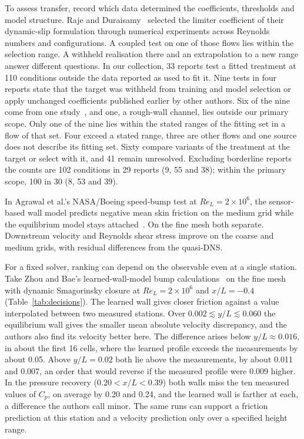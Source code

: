 \documentclass[pdflatex,sn-nature,iicol]{sn-jnl}
\begin{document}
To assess transfer, record which data determined the coefficients, thresholds and model structure. Raje and Duraisamy~\cite{Raje2025} selected the limiter coefficient of their dynamic-slip formulation through numerical experiments across Reynolds numbers and configurations. A coupled test on one of those flows lies within the selection range. A withheld realisation there and an extrapolation to a new range answer different questions. In our collection, 33 reports test a fitted treatment at 110 conditions outside the data reported as used to fit it. Nine tests in four reports state that the target was withheld from training and model selection or apply unchanged coefficients published earlier by other authors. Six of the nine come from one study~\cite{LozanoDuranBae2023}, and one, a rough-wall channel, lies outside our primary scope. Only one of the nine lies within the stated ranges of the fitting set in a flow of that set. Four exceed a stated range, three are other flows and one source does not describe its fitting set. Sixty compare variants of the treatment at the target or select with it, and 41 remain unresolved. Excluding borderline reports the counts are 102 conditions in 29 reports (9, 55 and 38); within the primary scope, 100 in 30 (8, 53 and 39).

In Agrawal et al.'s NASA/Boeing speed-bump test at $Re_L=2\times10^6$, the sensor-based wall model predicts negative mean skin friction on the medium grid while the equilibrium model stays attached~\cite{Agrawal2024}. On the fine mesh both separate. Downstream velocity and Reynolds shear stress improve on the coarse and medium grids, with residual differences from the quasi-DNS.

\noindent For a fixed solver, ranking can depend on the observable even at a single station. Take Zhou and Bae's learned-wall-model bump calculations~\cite{DiZhou2024} on the fine mesh with dynamic Smagorinsky closure at $Re_L=2\times10^6$ and $x/L=-0.4$ (Table~\ref{tab:decisions}). The learned wall gives closer friction against a value interpolated between two measured stations. Over $0.002\lesssim y/L\lesssim0.060$ the equilibrium wall gives the smaller mean absolute velocity discrepancy, and the authors also find its velocity better here. The difference arises below $y/L\approx0.016$, in about the first 16 cells, where the learned profile exceeds the measurements by about 0.05. Above $y/L=0.02$ both lie above the measurements, by about 0.011 and 0.007, an order that would reverse if the measured profile were 0.009 higher. In the pressure recovery ($0.20<x/L<0.39$) both walls miss the ten measured values of $C_p$, on average by 0.20 and 0.24, and the learned wall is farther at each, a difference the authors call minor. The same runs can support a friction prediction at this station and a velocity prediction only over a specified height range.
\end{document}
